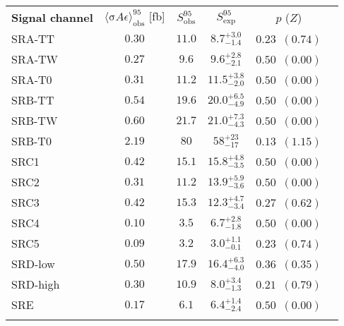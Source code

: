 {\renewcommand{\arraystretch}{1.3}
\begin{tabular*}{\textwidth}{@{\extracolsep{\fill}}lccccc}
\noalign{\smallskip}\toprule\noalign{\smallskip}
{\textbf{Signal channel}}                        & $\langle{\mathrm{\sigma}} A \epsilon\rangle_{\mathrm{obs}}^{95}$ [fb]  &  $S_{\mathrm{obs}}^{95}$  & $S_{\mathrm{exp}}^{95}$ & $p$ ($Z$)  \\
\noalign{\smallskip}\midrule\noalign{\smallskip}

SRA-TT    & $0.30$ &  $11.0$ & $ { 8.7 }^{ +3.0 }_{ -1.4 }$ & $ 0.23$~$(0.74)$ \\%
SRA-TW    & $0.27$ &  $9.6$ & $ { 9.6 }^{ +2.8 }_{ -2.1 }$ & $ 0.50$~$(0.00)$ \\%
SRA-T0    & $0.31$ &  $11.2$ & $ { 11.5 }^{ +3.8 }_{ -2.0 }$ & $ 0.50$~$(0.00)$ \\%
SRB-TT    & $0.54$ &  $19.6$ & $ { 20.0 }^{ +6.5 }_{ -4.9 }$ & $ 0.50$~$(0.00)$ \\%
SRB-TW    & $0.60$ &  $21.7$ & $ { 21.0 }^{ +7.3 }_{ -4.3 }$ & $ 0.50$~$(0.00)$ \\%
SRB-T0    & $2.19$ &  $80$ & $ { 58 }^{ +23 }_{ -17 }$ & $ 0.13$~$(1.15)$ \\%
SRC1    & $0.42$ &  $15.1$ & $ { 15.8 }^{ +4.8 }_{ -3.5 }$ & $ 0.50$~$(0.00)$ \\%
SRC2    & $0.31$ &  $11.2$ & $ { 13.9 }^{ +5.9 }_{ -3.6 }$ & $ 0.50$~$(0.00)$ \\%
SRC3    & $0.42$ &  $15.3$ & $ { 12.3 }^{ +4.7 }_{ -3.4 }$ & $ 0.27$~$(0.62)$ \\%
SRC4    & $0.10$ &  $3.5$ & $ { 6.7 }^{ +2.8 }_{ -1.8 }$ & $ 0.50$~$(0.00)$ \\%
SRC5    & $0.09$ &  $3.2$ & $ { 3.0 }^{ +1.1 }_{ -0.1 }$ & $ 0.23$~$(0.74)$ \\%
SRD-low    & $0.50$ &  $17.9$ & $ { 16.4 }^{ +6.3 }_{ -4.0 }$ & $ 0.36$~$(0.35)$ \\%
SRD-high    & $0.30$ &  $10.9$ & $ { 8.0 }^{ +3.4 }_{ -1.3 }$ & $ 0.21$~$(0.79)$ \\%
SRE    & $0.17$ &  $6.1$ & $ { 6.4 }^{ +1.4 }_{ -2.4 }$ & $ 0.50$~$(0.00)$ \\%

\noalign{\smallskip}\bottomrule\noalign{\smallskip}
\end{tabular*}
}
%
